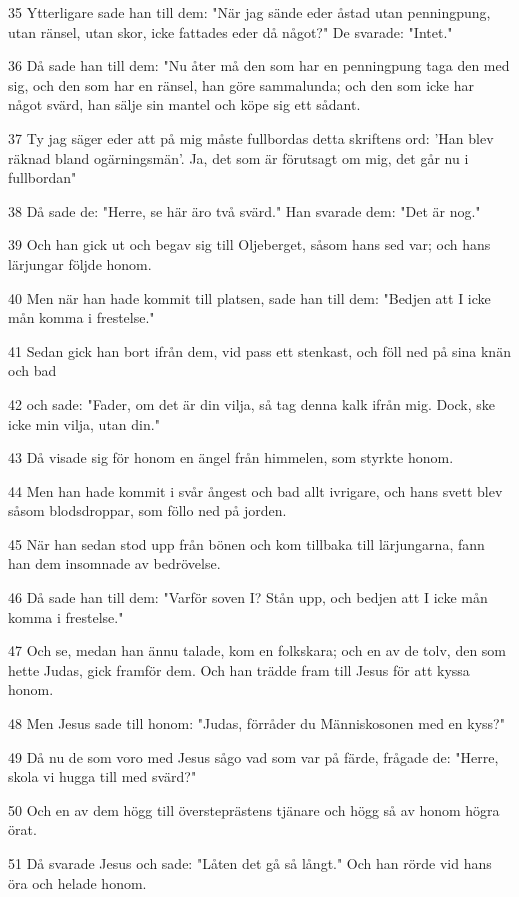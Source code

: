 \par 35 Ytterligare sade han till dem: "När jag sände eder åstad utan penningpung, utan ränsel, utan skor, icke fattades eder då något?" De svarade: "Intet."
\par 36 Då sade han till dem: "Nu åter må den som har en penningpung taga den med sig, och den som har en ränsel, han göre sammalunda; och den som icke har något svärd, han sälje sin mantel och köpe sig ett sådant.
\par 37 Ty jag säger eder att på mig måste fullbordas detta skriftens ord: 'Han blev räknad bland ogärningsmän'. Ja, det som är förutsagt om mig, det går nu i fullbordan"
\par 38 Då sade de: "Herre, se här äro två svärd." Han svarade dem: "Det är nog."
\par 39 Och han gick ut och begav sig till Oljeberget, såsom hans sed var; och hans lärjungar följde honom.
\par 40 Men när han hade kommit till platsen, sade han till dem: "Bedjen att I icke mån komma i frestelse."
\par 41 Sedan gick han bort ifrån dem, vid pass ett stenkast, och föll ned på sina knän och bad
\par 42 och sade: "Fader, om det är din vilja, så tag denna kalk ifrån mig. Dock, ske icke min vilja, utan din."
\par 43 Då visade sig för honom en ängel från himmelen, som styrkte honom.
\par 44 Men han hade kommit i svår ångest och bad allt ivrigare, och hans svett blev såsom blodsdroppar, som föllo ned på jorden.
\par 45 När han sedan stod upp från bönen och kom tillbaka till lärjungarna, fann han dem insomnade av bedrövelse.
\par 46 Då sade han till dem: "Varför soven I? Stån upp, och bedjen att I icke mån komma i frestelse."
\par 47 Och se, medan han ännu talade, kom en folkskara; och en av de tolv, den som hette Judas, gick framför dem. Och han trädde fram till Jesus för att kyssa honom.
\par 48 Men Jesus sade till honom: "Judas, förråder du Människosonen med en kyss?"
\par 49 Då nu de som voro med Jesus sågo vad som var på färde, frågade de: "Herre, skola vi hugga till med svärd?"
\par 50 Och en av dem högg till översteprästens tjänare och högg så av honom högra örat.
\par 51 Då svarade Jesus och sade: "Låten det gå så långt." Och han rörde vid hans öra och helade honom.
